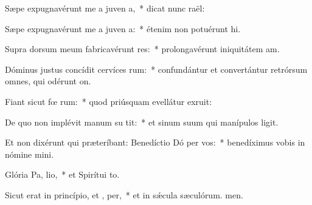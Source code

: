 \item Sæpe expugnavérunt me a juven a,~* dicat nunc raël:
\item Sæpe expugnavérunt me a juven a:~* étenim non potuérunt hi.
\item Supra dorsum meum fabricavérunt res:~* prolongavérunt iniquitátem am.
\item Dóminus justus concídit cervíces rum:~* confundántur et convertántur retrórsum omnes, qui odérunt on.
\item Fiant sicut fœ rum:~* quod priúsquam evellátur exruit:
\item De quo non implévit manum su  tit:~* et sinum suum qui manípulos ligit.
\item Et non dixérunt qui præteríbant: Benedíctio Dó per vos:~* benedíximus vobis in nómine mini.
\item Glória Pa,  lio,~* et Spirítui to.
\item Sicut erat in princípio, et ,  per,~* et in sǽcula sæculórum. men.
